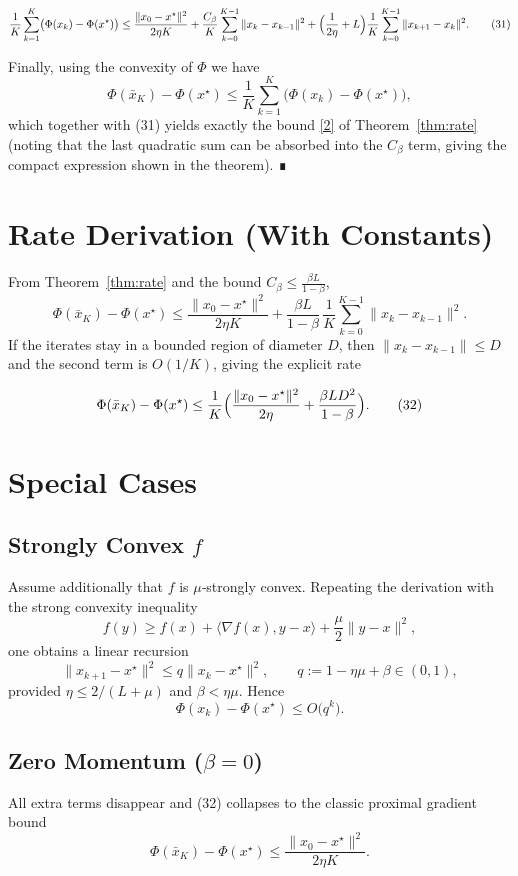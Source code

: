\documentclass{article}
\begin{document}
\[
\frac{1}{K}\sum_{k=1}^{K}\bigl(\Phi(x_{k})-\Phi(x^{\star})\bigr)
\le
\frac{\|x_{0}-x^{\star}\|^{2}}{2\eta K}
+ \frac{C_{\beta}}{K}\sum_{k=0}^{K-1}\|x_{k}-x_{k-1}\|^{2}
+ \Bigl(\frac{1}{2\eta}+L\Bigr)\frac{1}{K}\sum_{k=0}^{K-1}\|x_{k+1}-x_{k}\|^{2}. \tag{31}
\]

Finally, using the convexity of $\Phi$ we have
\[
\Phi(\bar x_{K})-\Phi(x^{\star})\le \frac{1}{K}\sum_{k=1}^{K}\bigl(\Phi(x_{k})-\Phi(x^{\star})\bigr),
\]
which together with (31) yields exactly the bound \eqref{2} of Theorem~\ref{thm:rate} (noting that the last quadratic sum can be absorbed into the $C_{\beta}$ term, giving the compact expression shown in the theorem). ∎

\section*{Rate Derivation (With Constants)}
From Theorem~\ref{thm:rate} and the bound $C_{\beta}\le\frac{\beta L}{1-\beta}$,
\[
\Phi(\bar x_{K})-\Phi(x^{\star})
\le
\frac{\|x_{0}-x^{\star}\|^{2}}{2\eta K}
+\frac{\beta L}{1-\beta}\,
\frac{1}{K}\sum_{k=0}^{K-1}\|x_{k}-x_{k-1}\|^{2}.
\]
If the iterates stay in a bounded region of diameter $D$, then $\|x_{k}-x_{k-1}\|\le D$ and the second term is $O(1/K)$, giving the explicit rate  

\[
\Phi(\bar x_{K})-\Phi(x^{\star})\le
\frac{1}{K}\Bigl(\frac{\|x_{0}-x^{\star}\|^{2}}{2\eta}
+\frac{\beta L D^{2}}{1-\beta}\Bigr). \tag{32}
\]

\section*{Special Cases}
\subsection*{Strongly Convex $f$}
Assume additionally that $f$ is $\mu$‑strongly convex. Repeating the derivation with the strong convexity inequality
\[
f(y)\ge f(x)+\langle\nabla f(x),y-x\rangle+\frac{\mu}{2}\|y-x\|^{2},
\]
one obtains a linear recursion
\[
\|x_{k+1}-x^{\star}\|^{2}\le q\|x_{k}-x^{\star}\|^{2},
\qquad
q:=1-\eta\mu+\beta\in(0,1),
\]
provided $\eta\le 2/(L+\mu)$ and $\beta<\eta\mu$. Hence
\[
\Phi(x_{k})-\Phi(x^{\star})\le O\bigl(q^{k}\bigr).
\]

\subsection*{Zero Momentum ($\beta=0$)}
All extra terms disappear and (32) collapses to the classic proximal gradient bound
\[
\Phi(\bar x_{K})-\Phi(x^{\star})\le\frac{\|x_{0}-x^{\star}\|^{2}}{2\eta K}.
\]
\end{document}
